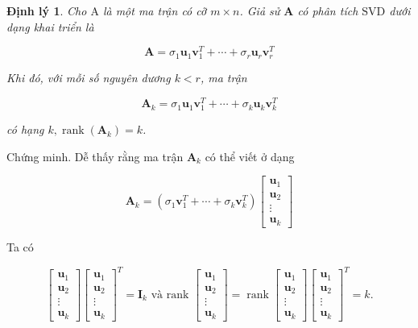 \documentclass[12pt,a4paper,oneside]{report}
\newtheorem{dl}{Định lý}[section]
\numberwithin{equation}{section}
\begin{document}
\begin{dl} 
Cho $\mathrm{A}$ là một ma trận có cỡ $m \times n$. Giả sử $\mathbf{A}$ có phân tích $\mathrm{SVD}$ dưới dạng khai triển là

$$
\mathbf{A}=\sigma_{1} \mathbf{u}_{1} \mathbf{v}_{1}^{T}+\cdots+\sigma_{r} \mathbf{u}_{r} \mathbf{v}_{r}^{T}
$$

Khi đó, với mỗi số nguyên dương $k<r$, ma trận

$$
\mathbf{A}_{k}=\sigma_{1} \mathbf{u}_{1} \mathbf{v}_{1}^{T}+\cdots+\sigma_{k} \mathbf{u}_{k} \mathbf{v}_{k}^{T}
$$

có hạng $k, \operatorname{rank}\left(\mathbf{A}_{k}\right)=k$.
\end{dl}
Chứng minh. Dễ thấy rằng ma trận $\mathbf{A}_{k}$ có thể viết ở dạng

$$
\mathbf{A}_{k}=\left(\sigma_{1} \mathbf{v}_{1}^{T}+\cdots+\sigma_{k} \mathbf{v}_{k}^{T}\right)\left[\begin{array}{c}
	\mathbf{u}_{1} \\
	\mathbf{u}_{2} \\
	\vdots \\
	\mathbf{u}_{k}
\end{array}\right]
$$

Ta có

$$
\left[\begin{array}{c}
	\mathbf{u}_{1} \\
	\mathbf{u}_{2} \\
	\vdots \\
	\mathbf{u}_{k}
\end{array}\right]\left[\begin{array}{c}
	\mathbf{u}_{1} \\
	\mathbf{u}_{2} \\
	\vdots \\
	\mathbf{u}_{k}
\end{array}\right]^{T}=\mathbf{I}_{k} \text { và rank }\left[\begin{array}{c}
	\mathbf{u}_{1} \\
	\mathbf{u}_{2} \\
	\vdots \\
	\mathbf{u}_{k}
\end{array}\right]=\operatorname{rank}\left[\begin{array}{c}
	\mathbf{u}_{1} \\
	\mathbf{u}_{2} \\
	\vdots \\
	\mathbf{u}_{k}
\end{array}\right]\left[\begin{array}{c}
	\mathbf{u}_{1} \\
	\mathbf{u}_{2} \\
	\vdots \\
	\mathbf{u}_{k}
\end{array}\right]^{T}=k .
$$
\end{document}
